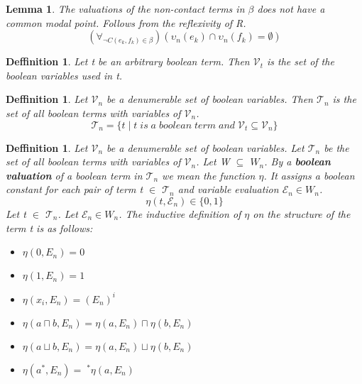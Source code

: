 \documentclass{article}
\newcommand\V{\mathcal{V}}
\newcommand\E{\mathcal{E}}
\newcommand\Tn{\mathcal{T}_n}
\newtheorem{lemma}[theorem]{Lemma}
\newtheorem{defn}[theorem]{Deffinition}
\begin{document}
		\begin{lemma}
			The valuations of the non-contact terms in $\beta$ does not have a common modal point. Follows from the reflexivity of R.
			\begin{equation}
				(\forall_{\neg C(e_k, f_k) \in \beta})(\upsilon_n(e_k) \cap \upsilon_n(f_k) = \emptyset)
			\end{equation}
		\end{lemma}

		\begin{defn}
			Let t be an arbitrary boolean term. Then $\V_t$ is the set of the boolean variables used in t.
		\end{defn}

		\begin{defn}
			Let $\V_n$ be a denumerable set of boolean variables. Then $\Tn$ is the set of all boolean terms with variables of $\V_n$.
			\begin{equation}
				\Tn = \{t \mid t \;is\; a \;boolean \;term \;and \;\V_t \subseteq \V_n \}
			\end{equation}
		\end{defn}

		\begin{defn}
			\label{boolean-valuation}
			Let $\V_n$ be a denumerable set of boolean variables. Let $\Tn$ be the set of all boolean terms with variables of $\V_n$. Let W $\subseteq$ $W_n$. By a \textbf{boolean valuation} of a boolean term in $\Tn$ we mean the function $\eta$. It assigns a boolean constant for each pair of term t $\in$ $\Tn$ and variable evaluation $\E_n \in W_n$.
			\begin{equation}
				\eta(t, \E_n) \in \{0, 1\}
			\end{equation}
			Let t $\in$ $\Tn$. Let $\E_n \in W_n$. The inductive definition of $\eta$ on the structure of the term t is as follows:
			\begin{itemize}
				\item $\eta(0, E_n) = 0$
				\item $\eta(1, E_n) = 1$
				\item $\eta(x_i, E_n) = (E_n)^i$		
				\item $\eta(a \sqcap b, E_n) = \eta(a, E_n) \sqcap \eta(b, E_n)$
				\item $\eta(a \sqcup b, E_n) = \eta(a, E_n) \sqcup \eta(b, E_n)$
				\item $\eta(a^*, E_n) = \;^*\eta(a, E_n)$
			\end{itemize}
		\end{defn}
\end{document}
